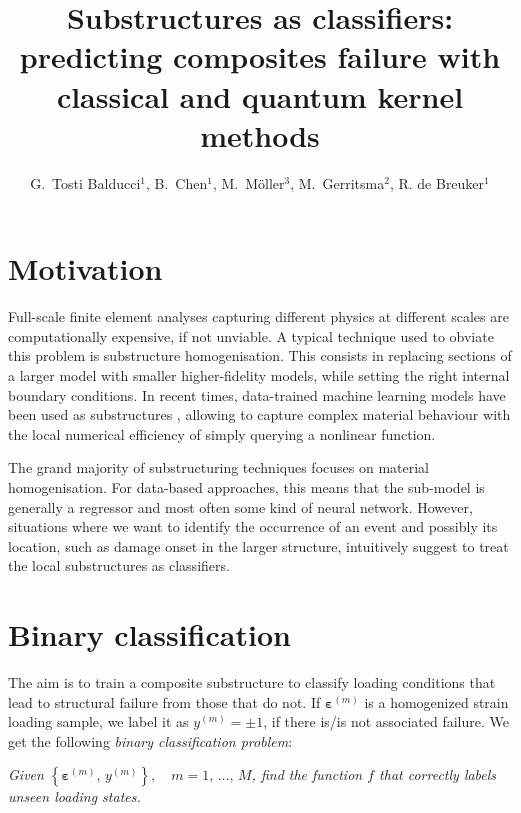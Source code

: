 \documentclass[9pt,a4paper]{extarticle}
\title{%
Substructures as classifiers: predicting composites failure with\\ classical and quantum kernel methods%
}
\author{%
G.\ Tosti Balducci$^1$, B.\ Chen$^1$,
M.\ M\"{o}ller$^3$, M.\ Gerritsma$^2$,
R. de Breuker$^1$%
}
\affiliation{%
$^1$ TU Delft, Aerospace Structures and Materials\\%
$^2$ TU Delft, Flow Physics and Technology\\%
$^3$ TU Delft, Applied Mathematics%
}
\begin{document}
\maketitle
\begin{multicols}{2}

\section{Motivation}
Full-scale finite element analyses capturing different physics at different scales are computationally expensive, if not unviable. A typical technique used to obviate this problem is substructure homogenisation. This consists in replacing sections of a larger model with smaller higher-fidelity models, while setting the right internal boundary conditions. In recent times, data-trained machine learning models have been used as substructures \cite{TGullikers}, allowing to capture complex material behaviour with the local numerical efficiency of simply querying a nonlinear function.

The grand majority of substructuring techniques focuses on material homogenisation. For data-based approaches, this means that the sub-model is generally a regressor and most often some kind of neural network. However, situations where we want to identify the occurrence of an event and possibly its location, such as damage onset in the larger structure, intuitively suggest to treat the local substructures as classifiers.

\section{Binary classification}
The aim is to train a composite substructure to classify loading conditions that lead to structural failure from those that do not. If $\bm{\varepsilon}^{(m)}$ is a homogenized strain loading sample, we label it as $y^{(m)} = \pm 1$, if there is/is not associated failure. We get the following \emph{binary classification problem}:
\begin{center}
    \emph{
    Given $\left\{ \bm{\varepsilon}^{(m)},\, y^{(m)}\right\},\quad m=1,\,\dots,\, M$, find the function $f$ that correctly labels unseen loading states.
    }
\end{center}


\end{multicols}
\end{document}

